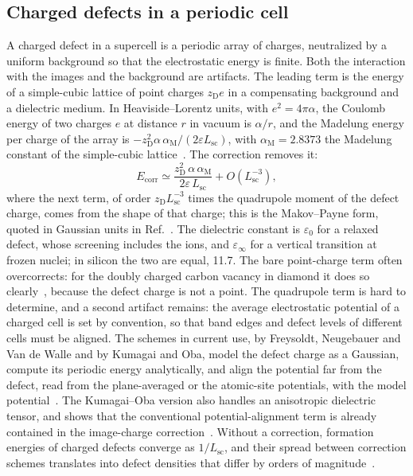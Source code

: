 \subsection{Charged defects in a periodic cell}

A charged defect in a supercell is a periodic array of charges, neutralized by a uniform background so that the electrostatic energy is finite. Both the interaction with the images and the background are artifacts. The leading term is the energy of a simple-cubic lattice of point charges $z_{\mathrm{D}}e$ in a compensating background and a dielectric medium. In Heaviside--Lorentz units, with $e^2 = 4\pi\alpha$, the Coulomb energy of two charges $e$ at distance $r$ in vacuum is $\alpha/r$, and the Madelung energy per charge of the array is $-z_{\mathrm{D}}^2\alpha\,\alpha_{\mathrm{M}}/(2\varepsilon L_{\mathrm{sc}})$, with $\alpha_{\mathrm{M}} = 2.8373$ the Madelung constant of the simple-cubic lattice~\cite[Sect.~II]{komsa2009comparison}. The correction removes it:
\begin{equation}
  E_{\mathrm{corr}} \simeq \frac{z_{\mathrm{D}}^2\,\alpha\,\alpha_{\mathrm{M}}}{2\varepsilon\,L_{\mathrm{sc}}} + O(L_{\mathrm{sc}}^{-3}) ,
  \label{eq:E.10-mp}
\end{equation}
where the next term, of order $z_{\mathrm{D}}L_{\mathrm{sc}}^{-3}$ times the quadrupole moment of the defect charge, comes from the shape of that charge; this is the Makov--Payne form, quoted in Gaussian units in Ref.~\cite[Eq.~(8)]{kim2020quickstart}. The dielectric constant is $\varepsilon_0$ for a relaxed defect, whose screening includes the ions, and $\varepsilon_\infty$ for a vertical transition at frozen nuclei; in silicon the two are equal, 11.7. The bare point-charge term often overcorrects: for the doubly charged carbon vacancy in diamond it does so clearly~\cite[Sect.~III\,B]{komsa2009comparison}, because the defect charge is not a point. The quadrupole term is hard to determine, and a second artifact remains: the average electrostatic potential of a charged cell is set by convention, so that band edges and defect levels of different cells must be aligned. The schemes in current use, by Freysoldt, Neugebauer and Van de Walle and by Kumagai and Oba, model the defect charge as a Gaussian, compute its periodic energy analytically, and align the potential far from the defect, read from the plane-averaged or the atomic-site potentials, with the model potential~\cite[Sect.~II and Eq.~(1)]{kumagai2014electrostatics}. The Kumagai--Oba version also handles an anisotropic dielectric tensor, and shows that the conventional potential-alignment term is already contained in the image-charge correction~\cite[Sect.~IV]{kumagai2014electrostatics}. Without a correction, formation energies of charged defects converge as $1/L_{\mathrm{sc}}$, and their spread between correction schemes translates into defect densities that differ by orders of magnitude~\cite[Sect.~3]{kim2020quickstart}.

